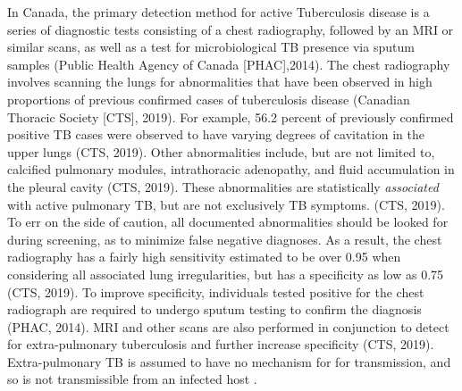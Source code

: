 \documentclass[sn-mathphys,Numbered]{sn-jnl}%
\theoremstyle{thmstyleone}%
\theoremstyle{thmstyletwo}%
\theoremstyle{thmstylethree}%
\begin{document}
     In Canada, the primary detection method for active Tuberculosis disease is a series of diagnostic tests consisting of a chest radiography, followed by an MRI or similar scans, as well as a test for microbiological TB presence via sputum samples (Public Health Agency of Canada [PHAC],2014). The chest radiography involves scanning the lungs for abnormalities that have been observed in high proportions of previous confirmed cases of tuberculosis disease (Canadian Thoracic Society [CTS], 2019). For example, 56.2 percent of previously confirmed positive TB cases were observed to have varying degrees of cavitation in the upper lungs (CTS, 2019). Other abnormalities include, but are not limited to, calcified pulmonary modules, intrathoracic adenopathy, and fluid accumulation in the pleural cavity (CTS, 2019). These abnormalities are statistically \textit{associated} with active pulmonary TB, but are not exclusively TB symptoms. (CTS, 2019). To err on the side of caution, all documented abnormalities should be looked for during screening, as to minimize false negative diagnoses. As a result, the chest radiography has a fairly high sensitivity estimated to be over 0.95 when considering all associated lung irregularities, but has a specificity as low as 0.75 (CTS, 2019). %
     To improve specificity, individuals tested positive for the chest radiograph are required to undergo sputum testing to confirm the diagnosis (PHAC, 2014). MRI and other scans are also performed in conjunction to detect for extra-pulmonary tuberculosis and further increase specificity (CTS, 2019).  Extra-pulmonary TB is assumed to have no mechanism for for transmission, and so is not transmissible from an infected host \cite{InfectiousHandbook}.
\end{document}
